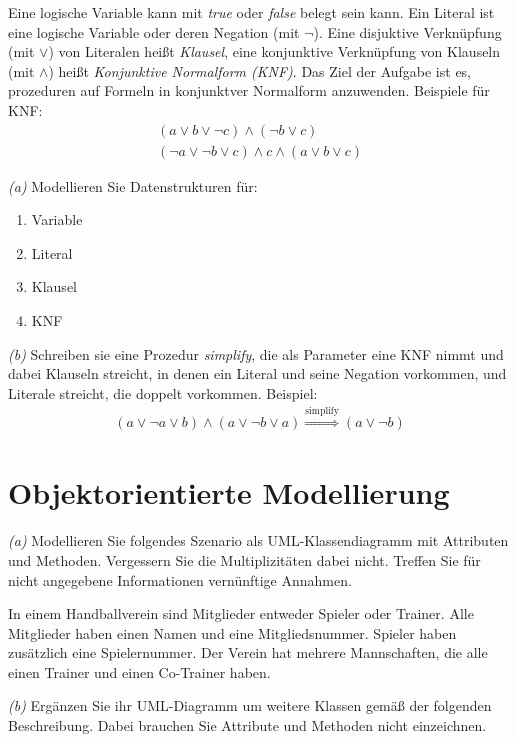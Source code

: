 \documentclass[11pt,a4paper,oneside,ngerman]{scrbook}
\begin{document}
Eine logische Variable kann mit \emph{true} oder \emph{false} belegt sein kann. Ein Literal ist eine logische Variable oder deren Negation (mit $\neg$). Eine disjuktive Verknüpfung (mit $\lor$) von Literalen heißt \emph{Klausel}, eine konjunktive Verknüpfung von Klauseln (mit $\land$) heißt \emph{Konjunktive Normalform (KNF)}. Das Ziel der Aufgabe ist es, prozeduren auf Formeln in konjunktver Normalform anzuwenden. Beispiele für KNF:
\begin{gather*}
  (a \lor b \lor \neg c) \land ( \neg b \lor c) \\
  (\neg a \lor \neg b \lor c ) \land c \land (a \lor b \lor c)
\end{gather*}

\emph{(a)} Modellieren Sie Datenstrukturen für:
\begin{enumerate}
  \item Variable
  \item Literal
  \item Klausel
  \item KNF
\end{enumerate}

\emph{(b)} Schreiben sie eine Prozedur \emph{simplify}, die als Parameter eine KNF nimmt und dabei Klauseln streicht, in denen ein Literal und seine Negation vorkommen, und Literale streicht, die doppelt vorkommen. Beispiel:
\begin{gather*}
  (a \lor \neg a \lor b) \land (a \lor \neg b \lor a) \overset{\text{simplify}}\Rightarrow (a \lor \neg b)
\end{gather*}

\newpage

\section{Objektorientierte Modellierung}
\emph{(a)} Modellieren Sie folgendes Szenario als UML-Klassendiagramm mit Attributen und Methoden. Vergessern Sie die Multiplizitäten dabei nicht. Treffen Sie für nicht angegebene Informationen vernünftige Annahmen.

In einem Handballverein sind Mitglieder entweder Spieler oder Trainer. Alle Mitglieder haben einen Namen und eine Mitgliedsnummer. Spieler haben zusätzlich eine Spielernummer. Der Verein hat mehrere Mannschaften, die alle einen Trainer und einen Co-Trainer haben.


\newpage

\emph{(b)} Ergänzen Sie ihr UML-Diagramm um weitere Klassen gemäß der folgenden Beschreibung. Dabei brauchen Sie Attribute und Methoden nicht einzeichnen.
\end{document}
